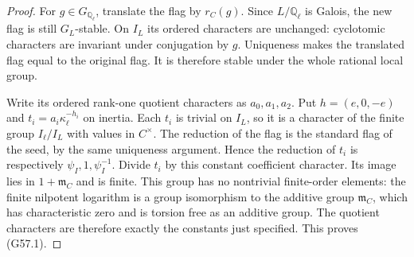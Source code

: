 \begin{proof}
For $g\in G_{\mathbb Q_\ell}$, translate the flag
by $r_C(g)$.  Since $L/\mathbb Q_\ell$ is Galois,
the new flag is still $G_L$-stable.  On $I_L$ its
ordered characters are unchanged: cyclotomic
characters are invariant under conjugation by $g$.
Uniqueness makes the translated flag equal to the
original flag.  It is therefore stable under the
whole rational local group.

Write its ordered rank-one quotient characters as
$a_0,a_1,a_2$.  Put $h=(e,0,-e)$ and
$t_i=a_i\kappa_\ell^{-h_i}$ on inertia.
Each $t_i$ is trivial on $I_L$, so it is a character
of the finite group $I_\ell/I_L$ with values in
$C^\times$.  The reduction of the flag is the
standard flag of the seed, by the same uniqueness
argument.  Hence the reduction of $t_i$ is respectively
$\psi_I,1,\psi_I^{-1}$.
Divide $t_i$ by this constant coefficient character.
Its image lies in $1+\mathfrak m_C$ and is finite.
This group has no nontrivial finite-order elements:
the finite nilpotent logarithm is a group isomorphism
to the additive group $\mathfrak m_C$, which has
characteristic zero and is torsion free as an additive
group.  The quotient characters are therefore exactly
the constants just specified.  This proves (G57.1).
\end{proof}

